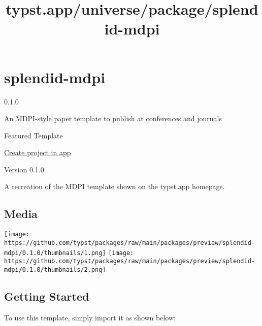\title{typst.app/universe/package/splendid-mdpi}

\label{banner}
\label{template-thumbnail}

\section{splendid-mdpi}\label{splendid-mdpi}

{ 0.1.0 }

An MDPI-style paper template to publish at conferences and journals

{ } Featured Template

\href{/app?template=splendid-mdpi&version=0.1.0}{Create project in app}

\label{readme}
Version 0.1.0

A recreation of the MDPI template shown on the typst.app homepage.

\subsection{Media}\label{media}

\texttt{[image: https://github.com/typst/packages/raw/main/packages/preview/splendid-mdpi/0.1.0/thumbnails/1.png]}
\texttt{[image: https://github.com/typst/packages/raw/main/packages/preview/splendid-mdpi/0.1.0/thumbnails/2.png]}

\subsection{Getting Started}\label{getting-started}

To use this template, simply import it as shown below:

